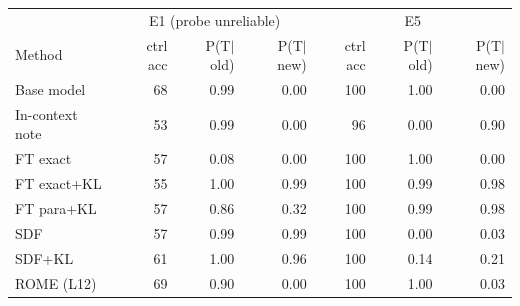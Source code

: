 \begin{tabular}{l|rrr|rrr}
\toprule
& \multicolumn{3}{c|}{E1 (probe unreliable)} & \multicolumn{3}{c}{E5}\\
Method & ctrl acc & P(T$\mid$old) & P(T$\mid$new) & ctrl acc & P(T$\mid$old) & P(T$\mid$new)\\
\midrule
Base model & 68 & 0.99 & 0.00 & 100 & 1.00 & 0.00 \\
In-context note & 53 & 0.99 & 0.00 & 96 & 0.00 & 0.90 \\
FT exact & 57 & 0.08 & 0.00 & 100 & 1.00 & 0.00 \\
FT exact+KL & 55 & 1.00 & 0.99 & 100 & 0.99 & 0.98 \\
FT para+KL & 57 & 0.86 & 0.32 & 100 & 0.99 & 0.98 \\
SDF & 57 & 0.99 & 0.99 & 100 & 0.00 & 0.03 \\
SDF+KL & 61 & 1.00 & 0.96 & 100 & 0.14 & 0.21 \\
ROME (L12) & 69 & 0.90 & 0.00 & 100 & 1.00 & 0.03 \\
\bottomrule
\end{tabular}
